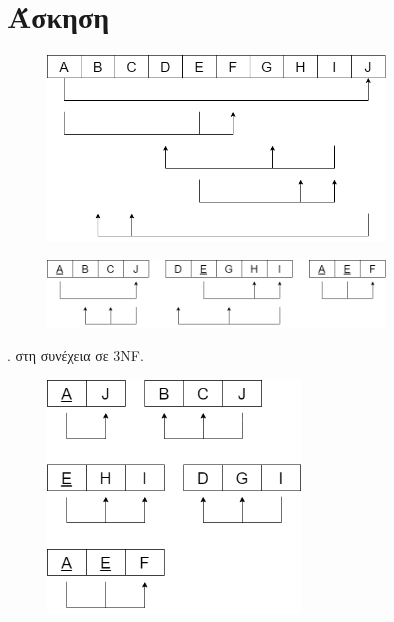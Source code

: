 \documentclass[12pt,a4paper, twoside, notitlepage]{report}
\begin{document}
\section{Άσκηση}

\begin{figure}[h]
  \centering
      \includegraphics[width=0.8\textwidth]{images/diagram1.png}
  \captionsetup{labelfont=bf}
\end{figure}

\begin{figure}[h]
  \centering
      \includegraphics[width=0.8\textwidth]{images/diagram2.png}
  \captionsetup{labelfont=bf}
\end{figure}
\hfill {}. στη συνέχεια σε \foreignlanguage{english}{3NF}.
\hfill \break

\begin{figure}[h]
  \centering
      \includegraphics[width=0.6\textwidth]{images/diagram3.png}
  \captionsetup{labelfont=bf}
\end{figure}
\end{document}
